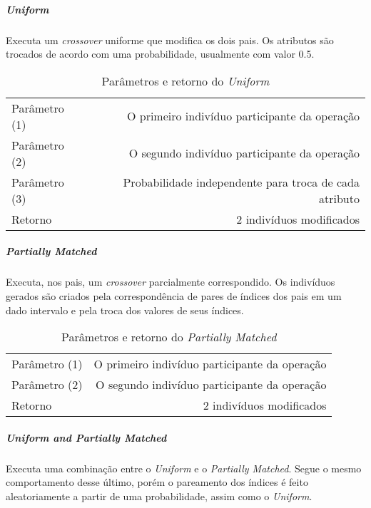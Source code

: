 \subparagraph{Uniform}
Executa um {\it crossover} uniforme que modifica os dois pais. Os atributos são trocados de acordo com uma probabilidade, usualmente com valor 0.5.\\

\begin{table}[!h]
  \begin{center}
  \begin{tabular}{|l|r|}
    \hline
    Parâmetro (1) & O primeiro indivíduo participante da operação \\
    Parâmetro (2) & O segundo indivíduo participante da operação \\
    Parâmetro (3) & Probabilidade independente para troca de cada atributo\\
    Retorno & 2 indivíduos modificados\\
    \hline    
  \end{tabular}
  \end{center}
  \caption{Parâmetros e retorno do {\it Uniform}}
  \label{Uniform}
\end{table}

\subparagraph{Partially Matched}
Executa, nos pais, um {\it crossover} parcialmente correspondido. Os indivíduos gerados são criados pela correspondência de pares de índices dos pais em um dado intervalo e pela troca dos valores de seus índices.\\

\begin{table}[!h]
  \begin{center}
  \begin{tabular}{|l|r|}
    \hline
    Parâmetro (1) & O primeiro indivíduo participante da operação \\
    Parâmetro (2) & O segundo indivíduo participante da operação \\
    Retorno & 2 indivíduos modificados\\
    \hline    
  \end{tabular}
  \end{center}
  \caption{Parâmetros e retorno do {\it Partially Matched}}
  \label{Partially Matched}
\end{table}

\subparagraph{Uniform and Partially Matched}
Executa uma combinação entre o {\it Uniform} e o {\it Partially Matched}. Segue o mesmo comportamento desse último, porém o pareamento dos índices é feito aleatoriamente a partir de uma probabilidade, assim como o {\it Uniform}.\\

